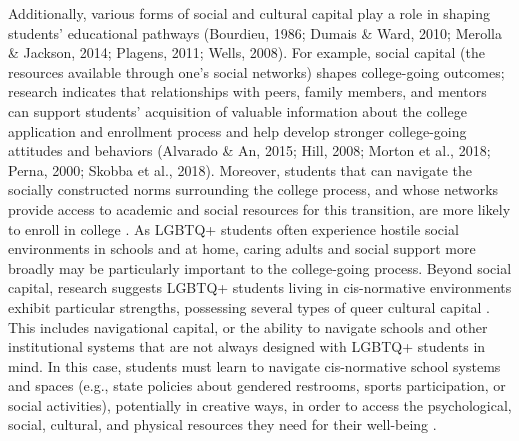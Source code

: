 Additionally, various forms of social and cultural capital play a role
in shaping students' educational pathways (Bourdieu, 1986; Dumais \&
Ward, 2010; Merolla \& Jackson, 2014; Plagens, 2011; Wells, 2008). For
example, social capital (the resources available through one's social
networks) shapes college-going outcomes; research indicates that
relationships with peers, family members, and mentors can support
students' acquisition of valuable information about the college
application and enrollment process and help develop stronger
college-going attitudes and behaviors (Alvarado \& An, 2015; Hill, 2008;
Morton et al., 2018; Perna, 2000; Skobba et al., 2018). Moreover,
students that can navigate the socially constructed norms surrounding
the college process, and whose networks provide access to academic and
social resources for this transition, are more likely to enroll in
college \citep{choi2008a, fletcher2015a}. As LGBTQ+ students often
experience hostile social environments in schools and at home, caring
adults and social support more broadly may be particularly important to
the college-going process. Beyond social capital, research suggests
LGBTQ+ students living in cis-normative environments exhibit particular
strengths, possessing several types of queer cultural capital \citep{pennell2016a}. This includes navigational capital, or the ability to navigate
schools and other institutional systems that are not always designed
with LGBTQ+ students in mind. In this case, students must learn to
navigate cis-normative school systems and spaces (e.g., state policies
about gendered restrooms, sports participation, or social activities),
potentially in creative ways, in order to access the psychological,
social, cultural, and physical resources they need for their well-being
\citep{pennell2016a}.

